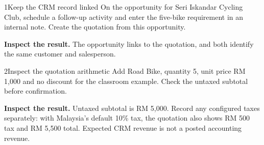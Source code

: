 
\begin{labquestion}{1}{Keep the CRM record linked}
On the opportunity for Seri Iskandar Cycling Club, schedule a follow-up activity and enter the five-bike requirement in an internal note. Create the quotation from this opportunity.
\end{labquestion}
\begin{labanswer}\textbf{Inspect the result.} The opportunity links to the quotation, and both identify the same customer and salesperson.\end{labanswer}

\begin{labquestion}{2}{Inspect the quotation arithmetic}
Add Road Bike, quantity 5, unit price RM 1,000 and no discount for the classroom example. Check the untaxed subtotal before confirmation.
\end{labquestion}
\begin{labanswer}\textbf{Inspect the result.} Untaxed subtotal is RM 5,000. Record any configured taxes separately: with Malaysia's default 10\% tax, the quotation also shows RM 500 tax and RM 5,500 total. Expected CRM revenue is not a posted accounting revenue.\end{labanswer}
